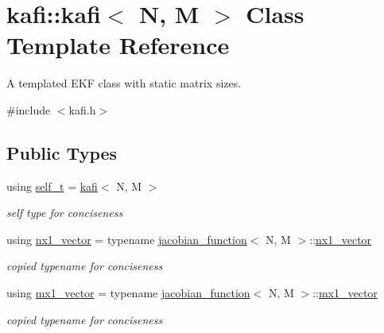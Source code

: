 \hypertarget{classkafi_1_1kafi}{}\section{kafi\+:\+:kafi$<$ N, M $>$ Class Template Reference}
\label{classkafi_1_1kafi}


A templated E\+KF class with static matrix sizes.  




{\ttfamily \#include $<$kafi.\+h$>$}

\subsection*{Public Types}
\begin{DoxyCompactItemize}
\item 
\mbox{\label{classkafi_1_1kafi_a9fc1cf6d76a14493ec33c03f3a3699c7}} 
using \hyperlink{classkafi_1_1kafi_a9fc1cf6d76a14493ec33c03f3a3699c7}{self\+\_\+t} = \hyperlink{classkafi_1_1kafi}{kafi}$<$ N, M $>$
\begin{DoxyCompactList}\small\item\em self type for conciseness \end{DoxyCompactList}\item 
\mbox{\label{classkafi_1_1kafi_a47144ae2efe936ede222eced035a6e46}} 
using \hyperlink{classkafi_1_1kafi_a47144ae2efe936ede222eced035a6e46}{nx1\+\_\+vector} = typename \hyperlink{classkafi_1_1jacobian__function}{jacobian\+\_\+function}$<$ N, M $>$\+::\hyperlink{classkafi_1_1kafi_a47144ae2efe936ede222eced035a6e46}{nx1\+\_\+vector}
\begin{DoxyCompactList}\small\item\em copied typename for conciseness \end{DoxyCompactList}\item 
\mbox{\label{classkafi_1_1kafi_a3a6f412f435a9e1f81178f36965822c3}} 
using \hyperlink{classkafi_1_1kafi_a3a6f412f435a9e1f81178f36965822c3}{mx1\+\_\+vector} = typename \hyperlink{classkafi_1_1jacobian__function}{jacobian\+\_\+function}$<$ N, M $>$\+::\hyperlink{classkafi_1_1kafi_a3a6f412f435a9e1f81178f36965822c3}{mx1\+\_\+vector}
\begin{DoxyCompactList}\small\item\em copied typename for conciseness \end{DoxyCompactList}\item 

\end{DoxyCompactItemize}
